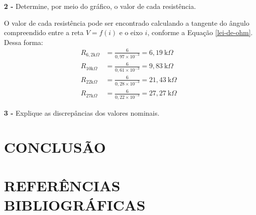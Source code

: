 \documentclass[12pt]{article}
\begin{document}
\noindent\textbf{2 - }Determine, por meio do gráfico, o valor de cada resistência.

O valor de cada resistência pode ser encontrado calculando a tangente do ângulo compreendido entre a reta $V=f(i)$ e o eixo $i$, conforme a Equação \ref{lei-de-ohm}. Dessa forma:
\begin{align*}
    R_{6,2\text{k}\Omega}&=\frac{6}{0,97\times 10^{-3}}= 6,19\ \text{k}\Omega \\
    R_{10\text{k}\Omega}&=\frac{6}{0,61\times 10^{-3}}= 9,83\ \text{k}\Omega \\
    R_{22\text{k}\Omega}&=\frac{6}{0,28\times 10^{-3}}= 21,43\ \text{k}\Omega \\
    R_{27\text{k}\Omega}&=\frac{6}{0,22\times 10^{-3}}= 27,27\ \text{k}\Omega
\end{align*}

\noindent\textbf{3 - }Explique as discrepâncias dos valores nominais.

\section{CONCLUSÃO}\indent

\newpage
{}
\section*{\hfill REFERÊNCIAS BIBLIOGRÁFICAS\hfill}
\printbibliography[heading=none]
\end{document}
